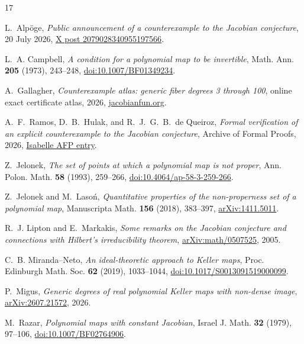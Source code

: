 \begin{thebibliography}{17}
\footnotesize
\setlength{\itemsep}{0pt}

L.~Alp\"oge,
\emph{Public announcement of a counterexample to the Jacobian conjecture},
20 July 2026,
\href{https://x.com/__alpoge__/status/2079028340955197566}
{X post 2079028340955197566}.

L.~A. Campbell,
\emph{A condition for a polynomial map to be invertible},
Math. Ann. \textbf{205} (1973), 243--248,
\href{https://doi.org/10.1007/BF01349234}
{doi:10.1007/BF01349234}.

A.~Gallagher,
\emph{Counterexample atlas: generic fiber degrees 3 through 100},
online exact certificate atlas, 2026,
\href{https://jacobianfun.org/counterexamples}{jacobianfun.org}.

A.~F.~Ramos, D.~B.~Hulak, and R.~J.~G.~B.~de Queiroz,
\emph{Formal verification of an explicit counterexample to the Jacobian
conjecture},
Archive of Formal Proofs, 2026,
\href{https://isa-afp.org/entries/Jacobian_Counterexample.html}
{Isabelle AFP entry}.

Z.~Jelonek,
\emph{The set of points at which a polynomial map is not proper},
Ann. Polon. Math. \textbf{58} (1993), 259--266,
\href{https://doi.org/10.4064/ap-58-3-259-266}
{doi:10.4064/ap-58-3-259-266}.

Z.~Jelonek and M.~Laso\'n,
\emph{Quantitative properties of the non-properness set of a polynomial map},
Manuscripta Math. \textbf{156} (2018), 383--397,
\href{https://arxiv.org/abs/1411.5011}{arXiv:1411.5011}.

R.~J. Lipton and E.~Markakis,
\emph{Some remarks on the Jacobian conjecture and connections with
Hilbert's irreducibility theorem},
\href{https://arxiv.org/abs/math/0507525}{arXiv:math/0507525}, 2005.

C.~B. Miranda--Neto,
\emph{An ideal-theoretic approach to Keller maps},
Proc. Edinburgh Math. Soc. \textbf{62} (2019), 1033--1044,
\href{https://doi.org/10.1017/S0013091519000099}
{doi:10.1017/S0013091519000099}.

P.~Migus,
\emph{Generic degrees of real polynomial Keller maps with non-dense image},
\href{https://arxiv.org/abs/2607.21572}{arXiv:2607.21572}, 2026.

M.~Razar,
\emph{Polynomial maps with constant Jacobian},
Israel J. Math. \textbf{32} (1979), 97--106,
\href{https://doi.org/10.1007/BF02764906}
{doi:10.1007/BF02764906}.


\end{thebibliography}
